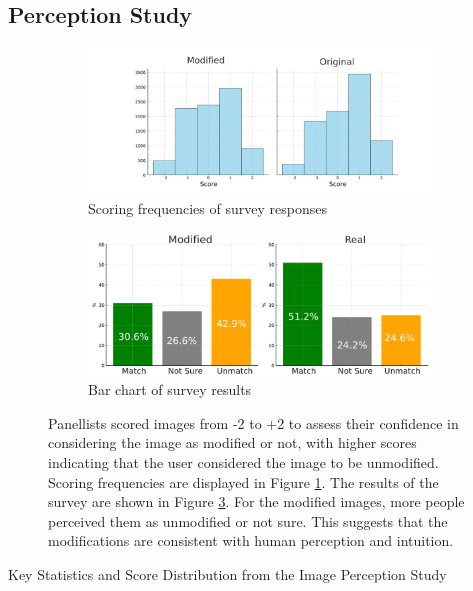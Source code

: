 \begin{spacing}{1.5}
\section{Perception Study}
\begin{figure}[t!]
    \centering
    \begin{subfigure}{.95\textwidth}
        \centering
        \includegraphics[width=0.95\columnwidth]{Chapter5/score.pdf}
        \caption{Scoring frequencies of survey responses}
        \label{fig:survey_hist}
    \end{subfigure}\hfill
    \begin{subfigure}{.95\textwidth}
        \centering
        \includegraphics[width=0.95\columnwidth]{Chapter5/bar_charts_modified.pdf}
        \caption{Bar chart of survey results}
        \label{fig:bar_charts}
    \end{subfigure}
    \caption{Panellists scored images from -2 to +2 to assess their confidence in considering the image as modified or not, with higher scores indicating that the user considered the image to be unmodified. Scoring frequencies are displayed in Figure \ref{fig:survey_hist}. The results of the survey are shown in Figure \ref{fig:bar_charts}. For the modified images, more people perceived them as unmodified or not sure. This suggests that the modifications are consistent with human perception and intuition.}
\end{figure}
\begin{table}[t!]
    \caption{Key Statistics and Score Distribution from the Image Perception Study}

\end{table}
\end{spacing}
